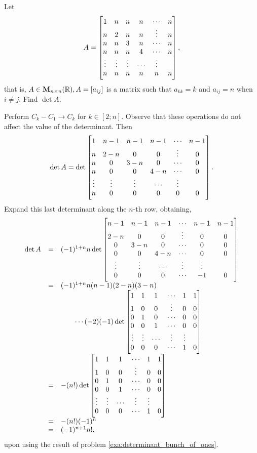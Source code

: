 \begin{pro}
Let $$A = \begin{bmatrix} 1 & n & n & n & \cdots & n \cr n & 2 & n
& n & \vdots & n \cr n & n & 3 & n & \cdots & n \cr n & n & n & 4
& \cdots & n \cr \vdots & \vdots & \vdots & \cdots & \vdots \cr n
& n & n & n & n & n \cr
\end{bmatrix},
$$that is, $A\in{\mathbf M}_{n\times n}(\mathbb{R}), A = [a_{ij}]$ is a matrix such that $a_{kk} = k$
and $a_{ij} = n$ when $i \neq j$. Find $\det A$. \begin{answer}
Perform $C_k - C_1 \rightarrow C_k$ for $k \in [2; n]$. Observe that
these operations do not affect the value of the determinant. Then
$$\det A = \det\begin{bmatrix} 1 & n - 1 & n - 1 & n - 1 & \cdots & n - 1 \cr n & 2 - n &
0 & 0 & \vdots & 0 \cr n & 0 & 3 - n & 0 & \cdots & 0 \cr n & 0 &
0 & 4-n & \cdots & 0 \cr \vdots & \vdots & \vdots & \cdots &
\vdots \cr n & 0 & 0 & 0 & 0 & 0 \cr
\end{bmatrix}.
$$Expand this last determinant along the $n$-th row, obtaining,
$$\begin{array}{lll}\det A & = &  (-1)^{1 + n}n\det\begin{bmatrix}  n - 1 & n - 1 & n - 1 & \cdots & n - 1 & n - 1 \cr  2 - n &
0 & 0 & \vdots & 0  & 0 \cr  0 & 3 - n & 0 & \cdots & 0  & 0 \cr 0
& 0 & 4-n & \cdots & 0  & 0 \cr  \vdots & \vdots & \cdots & \vdots
& \vdots \cr 0 & 0 & 0 & \cdots & -1 & 0  \cr
\end{bmatrix} \\
& = & (-1)^{1 + n}n(n - 1)(2 - n)(3 - n)\\ & & \qquad \cdots
(-2)(-1) \det\begin{bmatrix}  1 & 1 & 1 & \cdots & 1 & 1 \cr  1& 0
& 0 & \vdots & 0  & 0 \cr  0 & 1 & 0 & \cdots & 0  & 0 \cr 0 & 0 &
1& \cdots & 0  & 0 \cr  \vdots & \vdots & \cdots & \vdots & \vdots
\cr 0 & 0 & 0 & \cdots & 1 & 0  \cr
\end{bmatrix} \\
& = & -(n!)\det\begin{bmatrix}  1 & 1 & 1 & \cdots & 1 & 1 \cr  1&
0 & 0 & \vdots & 0  & 0 \cr  0 & 1 & 0 & \cdots & 0  & 0 \cr 0 & 0
& 1& \cdots & 0  & 0 \cr  \vdots & \vdots & \cdots & \vdots &
\vdots \cr 0 & 0 & 0 & \cdots & 1 & 0  \cr
\end{bmatrix} \\
& = & -(n!)(-1)^{n} \\
& = & (-1)^{n + 1}n!,
\end{array}$$
upon using the result of problem
\ref{exa:determinant_bunch_of_ones}.
\end{answer}
\end{pro}
